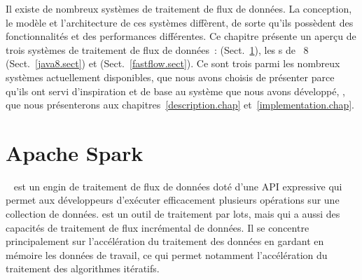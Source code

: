 



Il existe de nombreux syst\`emes de traitement de flux de donn\'ees. La conception, le mod\`ele et l'architecture de ces syst\`emes diff\`erent, de sorte qu'ils poss\`edent des fonctionnalit\'es et des performances diff\'erentes. Ce chapitre pr\'esente un aper\c{c}u de trois syst\`emes de traitement de flux de donn\'ees~:  (Sect.~\ref{spark.sect}), les s de ~8 (Sect.~\ref{java8.sect}) et  (Sect.~\ref{fastflow.sect}).  Ce sont trois parmi les nombreux syst\`emes actuellement disponibles, que nous avons choisis de pr\'esenter parce qu'ils ont servi d'inspiration et de base au syst\`eme que nous avons d\'evelopp\'e, \ppff, que nous pr\'esenterons aux chapitres~\ref{description.chap} et~\ref{implementation.chap}.


\section{Apache Spark}

\label{spark.sect}




~\citep{apachSpark} est un engin de traitement de flux de donn\'ees dot\'e d'une API expressive qui permet aux d\'eveloppeurs d'ex\'ecuter efficacement plusieurs op\'erations sur une collection de donn\'ees.  est un outil de traitement par lots, mais qui a aussi des capacit\'es de traitement de flux incr\'emental de donn\'ees. Il se concentre principalement sur l'acc\'el\'eration du traitement des donn\'ees en gardant en m\'emoire les donn\'ees de travail, ce qui permet notamment l'acc\'el\'eration du traitement des algorithmes it\'eratifs.

